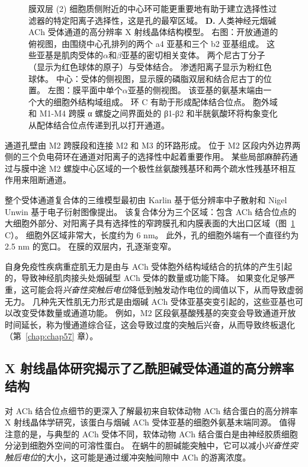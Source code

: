 \begin{figure}[htbp]
{		膜双层 (2) 细胞质侧附近的中心环可能更重要地有助于建立选择性过滤器的特定阳离子选择性，这是孔的最窄区域。
		\textbf{D.} 人类神经元烟碱 ACh 受体通道的高分辨率 X 射线晶体结构模型。
		右图：开放通道的俯视图，由围绕中心孔排列的两个 a4 亚基和三个 b2 亚基组成。
		这些亚基是肌肉受体的$\alpha$和$\beta$亚基的密切相关变体。
		两个尼古丁分子（显示为红色球体的原子）与受体结合。
		渗透阳离子显示为粉红色球体。
		中心：受体的侧视图，显示膜的磷脂双层和结合尼古丁的位置。
		左图：膜平面中单个$\alpha$亚基的侧视图。
		该亚基的氨基末端由一个大的细胞外结构域组成。
		环 C 有助于形成配体结合位点。
		胞外域和 M1-M4 跨膜 α 螺旋之间界面处的 β1-β2 和半胱氨酸环将构象变化从配体结合位点传递到孔以打开通道\cite{morales2016x}。}
	\label{fig:12_11}
\end{figure}


通道孔壁由 M2 跨膜段和连接 M2 和 M3 的环路形成。
位于 M2 区段内外边界两侧的三个负电荷环在通道对阳离子的选择性中起着重要作用。
某些局部麻醉药通过与膜中途 M2 螺旋中心区域的一个极性丝氨酸残基环和两个疏水性残基环相互作用来阻断通道。


整个受体通道复合体的三维模型最初由 Karlin 基于低分辨率中子散射和 Nigel Unwin 基于电子衍射图像提出。
该复合体分为三个区域：包含 ACh 结合位点的大细胞外部分、对阳离子具有选择性的窄跨膜孔和内膜表面的大出口区域（图~\ref{fig:12_11} C）。
细胞外区域非常大，长度约为 6 nm。
此外，孔的细胞外端有一个直径约为 2.5 nm 的宽口。 
在膜的双层内，孔逐渐变窄。


自身免疫性疾病重症肌无力是由与 ACh 受体胞外结构域结合的抗体的产生引起的，导致神经肌肉接头处烟碱型 ACh 受体的数量或功能下降。
如果变化足够严重，这可能会将\textit{兴奋性突触后电位}降低到触发动作电位的阈值以下，从而导致虚弱无力。
几种先天性肌无力形式是由烟碱 ACh 受体亚基突变引起的，这些亚基也可以改变受体数量或通道功能。
例如，M2 区段氨基酸残基的突变会导致通道开放时间延长，称为慢通道综合征，这会导致过度的突触后兴奋，从而导致终板退化（第~\ref{chap:chap57} 章）。



\subsection{X 射线晶体研究揭示了乙酰胆碱受体通道的高分辨率结构}

对 ACh 结合位点细节的更深入了解最初来自软体动物 ACh 结合蛋白的高分辨率 X 射线晶体学研究，该蛋白与烟碱 ACh 受体亚基的细胞外氨基末端同源。
值得注意的是，与典型的 ACh 受体不同，软体动物 ACh 结合蛋白是由神经胶质细胞分泌到细胞外空间的可溶性蛋白。
在蜗牛的胆碱能突触中，它可以减小\textit{兴奋性突触后电位}的大小，这可能是通过缓冲突触间隙中 ACh 的游离浓度。



